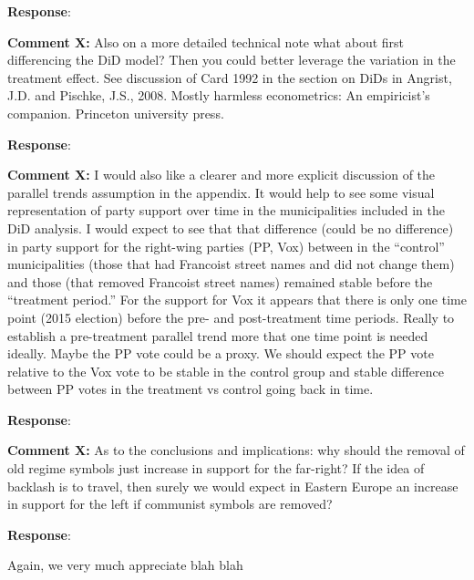 \documentclass[12pt, a4paper, notitlepage]{article}
\begin{document}
\textbf{Response}: {\color{red}{pending}}

\textbf{Comment X:} Also on a more detailed technical note what about first differencing the DiD model? Then you could better leverage the variation in the treatment effect. See discussion of Card 1992 in the section on DiDs in Angrist, J.D. and Pischke, J.S., 2008. Mostly harmless econometrics: An empiricist's companion. Princeton university press.

\textbf{Response}: {\color{red}{pending}}

\textbf{Comment X:} I would also like a clearer and more explicit discussion of the parallel trends assumption in the appendix. It would help to see some visual representation of party support over time in the municipalities included in the DiD analysis. I would expect to see that that difference (could be no difference) in party support for the right-wing parties (PP, Vox) between in the “control” municipalities (those that had Francoist street names and did not change them) and those (that removed Francoist street names) remained stable before the “treatment period.” For the support for Vox it appears that there is only one time point (2015 election) before the pre- and post-treatment time periods. Really to establish a pre-treatment parallel trend more that one time point is needed ideally. Maybe the PP vote could be a proxy. We should expect the PP vote relative to the Vox vote to be stable in the control group and stable difference between PP votes in the treatment vs control going back in time.  

\textbf{Response}: {\color{red}{pending}}

\textbf{Comment X:} As to the conclusions and implications: why should the removal of old regime symbols just increase in support for the far-right? If the idea of backlash is to travel, then surely we would expect in Eastern Europe an increase in support for the left if communist symbols are removed?

\textbf{Response}: {\color{red}{pending}}

\vspace{30pt}

Again, we very much appreciate  blah blah

\newpage 


\end{document}
